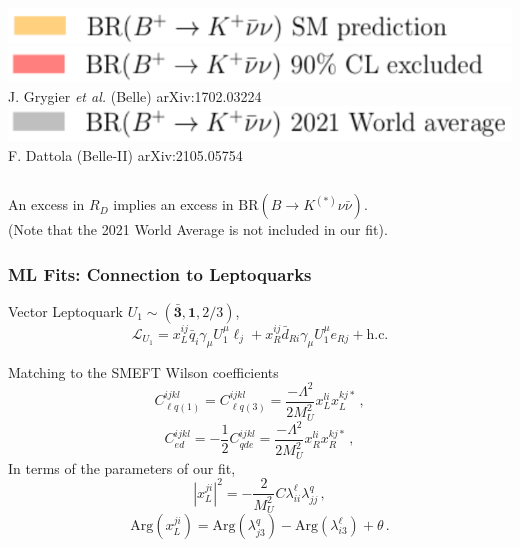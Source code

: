 \documentclass[mathserif, 10pt, dvipsnames]{beamer}
\newcommand\colorcite[1]{{\scriptsize\color{unizarblue}#1}}
\begin{document}
\begin{frame}
\begin{center}
\begin{columns}[onlytextwidth]
\begin{column}{0.45\textwidth}
        \includegraphics[width=\textwidth]{figures/RD_BKnunu_leg4.pdf}\\[2pt]
        \includegraphics[width=\textwidth]{figures/RD_BKnunu_leg5.pdf}\\[-6pt]
        \colorcite{J. Grygier \textit{et al.} (Belle) arXiv:1702.03224}\\[4pt]
        \includegraphics[width=\textwidth]{figures/RD_BKnunu_leg6.pdf}\\[-6pt]
        \colorcite{F. Dattola (Belle-II) arXiv:2105.05754}
    \end{column}
\end{columns}

    \end{center}

    An excess in $R_D$ implies an excess in $\mathrm{BR}(B\to K^{(*)}\nu\bar{\nu})$. \\(Note that the {\color{gray}2021 World Average} is not included in our fit).

\end{frame}

\begin{frame}\frametitle{ML Fits: Connection to Leptoquarks}

    Vector Leptoquark $U_1 \sim (\bar{\mathbf{3}}, \mathbf{1}, 2/3)$,
    $$\mathcal{L}_{U_1} = x_L^{ij} \bar{q}_i \gamma_\mu U_1^\mu \ell_j + x_R^{ij} \bar{d}_{Ri} \gamma_\mu U_1^\mu e_{Rj} + \mathrm{h.c.} $$

    Matching to the SMEFT Wilson coefficients
    $$C_{\ell q(1)}^{ijkl} = C_{\ell q(3)}^{ijkl} = \frac{-\Lambda^2}{2M_U^2}x_L^{li}x_L^{kj*}\,,$$
    $$C_{ed}^{ijkl} = -\frac{1}{2}C_{qde}^{ijkl} = \frac{-\Lambda^2}{2M_U^2}x_R^{li}x_R^{kj*}\,,$$
    In terms of the parameters of our fit,
    $$|x_L^{ji}|^2 = -\frac{2}{M_U^2}C\lambda^\ell_{ii}\lambda^q_{jj}\,,$$
    $$\mathrm{Arg}(x_L^{ji}) = \mathrm{Arg}(\lambda_{j3}^q)-\mathrm{Arg}(\lambda_{i3}^\ell) + \theta\,.$$ %

\end{frame}
\end{document}
